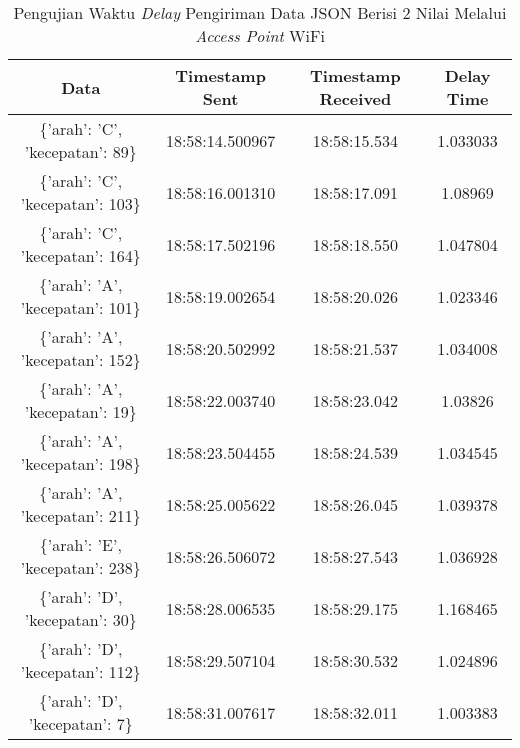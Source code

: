 \begin{longtable}{|ccc|c|}
  \caption{Pengujian Waktu \emph{Delay} Pengiriman Data JSON Berisi 2 Nilai Melalui \emph{Access Point} WiFi}
  \label{tbl:delayWiFiJSON}\\
    \hline
    \multicolumn{1}{|c|}{Data}                              & \multicolumn{1}{c|}{Timestamp Sent}  & Timestamp Received & Delay Time  \\ \hline
    \endfirsthead
    \endhead
    \multicolumn{1}{|c|}{\{'arah': 'C', 'kecepatan': 89\}}  & \multicolumn{1}{c|}{18:58:14.500967} & 18:58:15.534       & 1.033033    \\ \hline
    \multicolumn{1}{|c|}{\{'arah': 'C', 'kecepatan': 103\}} & \multicolumn{1}{c|}{18:58:16.001310} & 18:58:17.091       & 1.08969     \\ \hline
    \multicolumn{1}{|c|}{\{'arah': 'C', 'kecepatan': 164\}} & \multicolumn{1}{c|}{18:58:17.502196} & 18:58:18.550       & 1.047804    \\ \hline
    \multicolumn{1}{|c|}{\{'arah': 'A', 'kecepatan': 101\}} & \multicolumn{1}{c|}{18:58:19.002654} & 18:58:20.026       & 1.023346    \\ \hline
    \multicolumn{1}{|c|}{\{'arah': 'A', 'kecepatan': 152\}} & \multicolumn{1}{c|}{18:58:20.502992} & 18:58:21.537       & 1.034008    \\ \hline
    \multicolumn{1}{|c|}{\{'arah': 'A', 'kecepatan': 19\}}  & \multicolumn{1}{c|}{18:58:22.003740} & 18:58:23.042       & 1.03826     \\ \hline
    \multicolumn{1}{|c|}{\{'arah': 'A', 'kecepatan': 198\}} & \multicolumn{1}{c|}{18:58:23.504455} & 18:58:24.539       & 1.034545    \\ \hline
    \multicolumn{1}{|c|}{\{'arah': 'A', 'kecepatan': 211\}} & \multicolumn{1}{c|}{18:58:25.005622} & 18:58:26.045       & 1.039378    \\ \hline
    \multicolumn{1}{|c|}{\{'arah': 'E', 'kecepatan': 238\}} & \multicolumn{1}{c|}{18:58:26.506072} & 18:58:27.543       & 1.036928    \\ \hline
    \multicolumn{1}{|c|}{\{'arah': 'D', 'kecepatan': 30\}}  & \multicolumn{1}{c|}{18:58:28.006535} & 18:58:29.175       & 1.168465    \\ \hline
    \multicolumn{1}{|c|}{\{'arah': 'D', 'kecepatan': 112\}} & \multicolumn{1}{c|}{18:58:29.507104} & 18:58:30.532       & 1.024896    \\ \hline
    \multicolumn{1}{|c|}{\{'arah': 'D', 'kecepatan': 7\}}   & \multicolumn{1}{c|}{18:58:31.007617} & 18:58:32.011       & 1.003383    \\ \hline

\end{longtable}

